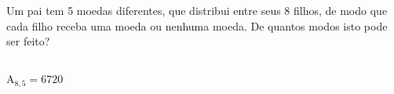 \begin{ex}
Um pai tem 5 moedas diferentes, que distribui entre seus 8 filhos, de modo que cada filho receba uma moeda ou nenhuma moeda. De quantos modos isto pode ser feito?
  \begin{sol}
    \phantom{A} \\
    $\mathrm{A}_{8,5}=6720$
  \end{sol}

\end{ex}